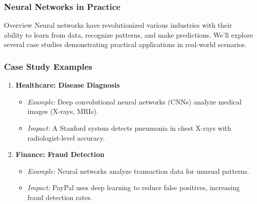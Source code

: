 \documentclass[aspectratio=169]{beamer}
\begin{document}
\begin{frame}[fragile]
    \frametitle{Neural Networks in Practice}
    \begin{block}{Overview}
        Neural networks have revolutionized various industries with their ability to learn from data, recognize patterns, and make predictions. 
        We’ll explore several case studies demonstrating practical applications in real-world scenarios.
    \end{block}
\end{frame}

\begin{frame}[fragile]
    \frametitle{Case Study Examples}
    \begin{enumerate}
        \item \textbf{Healthcare: Disease Diagnosis}
            \begin{itemize}
                \item \textit{Example:} Deep convolutional neural networks (CNNs) analyze medical images (X-rays, MRIs).
                \item \textit{Impact:} A Stanford system detects pneumonia in chest X-rays with radiologist-level accuracy.
            \end{itemize}
        \item \textbf{Finance: Fraud Detection}
            \begin{itemize}
                \item \textit{Example:} Neural networks analyze transaction data for unusual patterns.
                \item \textit{Impact:} PayPal uses deep learning to reduce false positives, increasing fraud detection rates.
            \end{itemize}
    \end{enumerate}
\end{frame}
\end{document}
